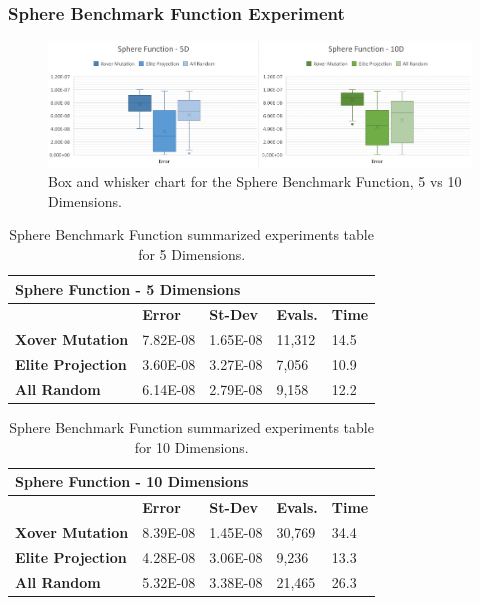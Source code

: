 \documentclass[graybox]{svmult}
\begin{document}
        \subsubsection{Sphere Benchmark Function Experiment}

            \begin{figure}
                \includegraphics[width=\linewidth, frame]{img/fig_fun_sphere.pdf}
                \caption{Box and whisker chart for the Sphere Benchmark Function, 5 vs 10 Dimensions.} \label{fig.fun_sphere}
                \end{figure}

            \begin{table}[]
                \scriptsize
                \centering
                \caption{Sphere Benchmark Function summarized experiments table for 5 Dimensions.}\label{tab.fun_sphere5}
                \begin{tabular}{@{}lllll@{}}
                \toprule
                \multicolumn{5}{l}{\textbf{Sphere Function - 5 Dimensions}} \\ \midrule
                & \textbf{Error} & \textbf{St-Dev} & \textbf{Evals.} & \textbf{Time} \\
                \textbf{Xover Mutation} & 7.82E-08 & 1.65E-08 & 11,312 & 14.5 \\
                \textbf{Elite Projection} & 3.60E-08 & 3.27E-08 & 7,056 & 10.9 \\
                \textbf{All Random} & 6.14E-08 & 2.79E-08 & 9,158 & 12.2 \\ \bottomrule
                \end{tabular}
                \end{table}

            \begin{table}[]
                \scriptsize
                \centering
                \caption{Sphere Benchmark Function summarized experiments table for 10 Dimensions.}\label{tab.fun_sphere10}
                \begin{tabular}{@{}lllll@{}}
                \toprule
                \multicolumn{5}{l}{\textbf{Sphere Function - 10 Dimensions}} \\ \midrule
                & \textbf{Error} & \textbf{St-Dev} & \textbf{Evals.} & \textbf{Time} \\
                \textbf{Xover Mutation} & 8.39E-08 & 1.45E-08 & 30,769 & 34.4 \\
                \textbf{Elite Projection} & 4.28E-08 & 3.06E-08 & 9,236 & 13.3 \\
                \textbf{All Random} & 5.32E-08 & 3.38E-08 & 21,465 & 26.3 \\ \bottomrule
                \end{tabular}
                \end{table}
\end{document}
